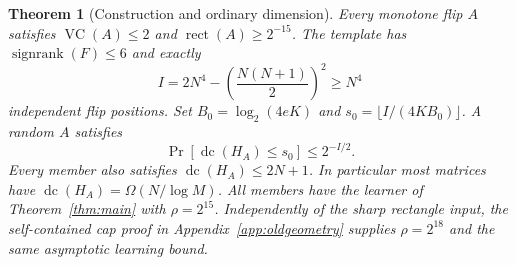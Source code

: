 \documentclass[11pt]{article}
\newtheorem{theorem}{Theorem}
\DeclareMathOperator{\dc}{dc}
\DeclareMathOperator{\sr}{signrank}
\DeclareMathOperator{\rect}{rect}
\newcommand{\1}{\mathbf 1}
\begin{document}
\begin{samepage}
\begin{theorem}[Construction and ordinary dimension]\label{thm:construction}
Every monotone flip $A$ satisfies $\operatorname{VC}(A)\le2$ and $\rect(A)\ge2^{-15}$. The template has $\sr(F)\le6$ and exactly
\begin{equation}\label{eq:I}
 I=2N^4-\left(\frac{N(N+1)}2\right)^2\ge N^4
\end{equation}
independent flip positions. Set $B_0=\log_2(4eK)$ and $s_0=\lfloor I/(4KB_0)\rfloor$. A random $A$ satisfies
\[
 \Pr[\dc(H_A)\le s_0]\le2^{-I/2}.
\]
Every member also satisfies $\dc(H_A)\le2N+1$. In particular most matrices have $\dc(H_A)=\Omega(N/\log M)$. All members have the learner of Theorem~\ref{thm:main} with $\rho=2^{15}$. Independently of the sharp rectangle input, the self-contained cap proof in Appendix~\ref{app:oldgeometry} supplies $\rho=2^{18}$ and the same asymptotic learning bound.
\end{theorem}
\end{samepage}
\end{document}
